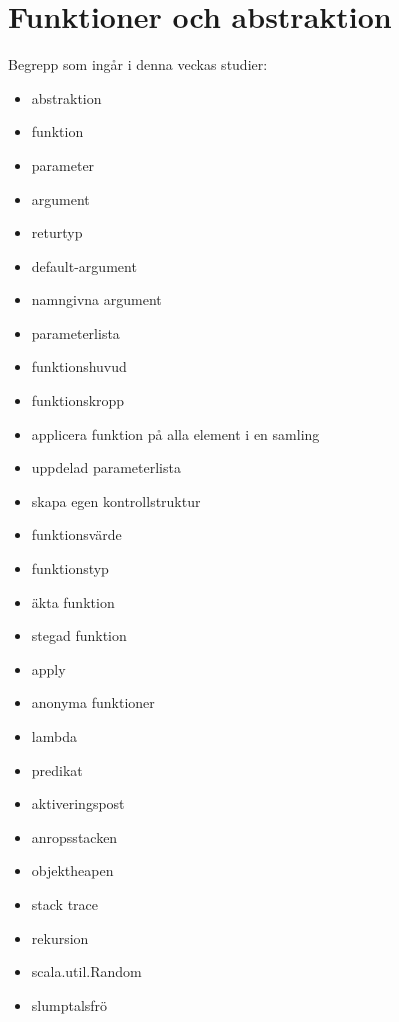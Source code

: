 \chapter{Funktioner och abstraktion}\label{chapter:W03}
Begrepp som ingår i denna veckas studier:
\begin{itemize}[noitemsep,label={$\square$},leftmargin=*]
\item abstraktion
\item funktion
\item parameter
\item argument
\item returtyp
\item default-argument
\item namngivna argument
\item parameterlista
\item funktionshuvud
\item funktionskropp
\item applicera funktion på alla element i en samling
\item uppdelad parameterlista
\item skapa egen kontrollstruktur
\item funktionsvärde
\item funktionstyp
\item äkta funktion
\item stegad funktion
\item apply
\item anonyma funktioner
\item lambda
\item predikat
\item aktiveringspost
\item anropsstacken
\item objektheapen
\item stack trace
\item rekursion
\item scala.util.Random
\item slumptalsfrö\end{itemize}

